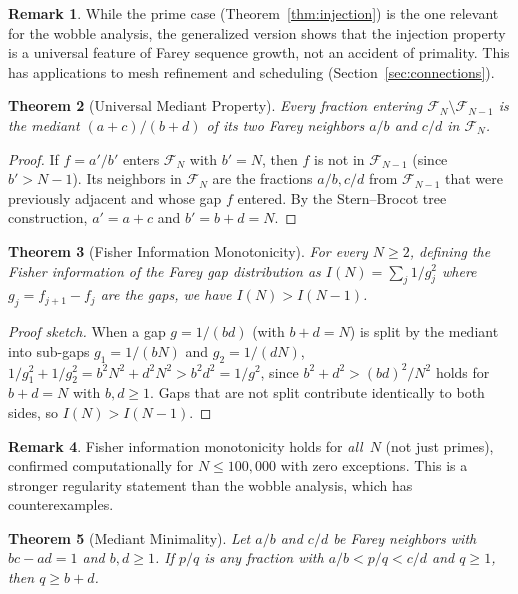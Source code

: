 \documentclass[11pt]{article}
\newtheorem{theorem}{Theorem}[section]
\theoremstyle{definition}
\newtheorem{remark}[theorem]{Remark}
\newcommand{\F}{\mathcal{F}}
\begin{document}
\begin{remark}
While the prime case (Theorem~\ref{thm:injection}) is the one
relevant for the wobble analysis, the generalized version shows
that the injection property is a universal feature of Farey
sequence growth, not an accident of primality.  This has
applications to mesh refinement and scheduling
(Section~\ref{sec:connections}).
\end{remark}

\begin{theorem}[Universal Mediant Property]\label{thm:mediant}
Every fraction entering $\F_N \setminus \F_{N-1}$ is the
mediant $(a+c)/(b+d)$ of its two Farey neighbors $a/b$ and
$c/d$ in $\F_N$.
\end{theorem}

\begin{proof}
If $f = a'/b'$ enters $\F_N$ with $b' = N$, then $f$ is
not in $\F_{N-1}$ (since $b' > N-1$).  Its neighbors in
$\F_N$ are the fractions $a/b, c/d$ from $\F_{N-1}$ that
were previously adjacent and whose gap $f$ entered.  By
the Stern--Brocot tree construction, $a' = a+c$ and
$b' = b+d = N$.
\end{proof}

\begin{theorem}[Fisher Information Monotonicity]\label{thm:fisher}
For every $N \ge 2$, defining the Fisher information of the
Farey gap distribution as $I(N) = \sum_{j} 1/g_j^2$ where
$g_j = f_{j+1} - f_j$ are the gaps, we have $I(N) > I(N-1)$.
\end{theorem}

\begin{proof}[Proof sketch]
When a gap $g = 1/(bd)$ (with $b + d = N$) is split by the
mediant into sub-gaps $g_1 = 1/(bN)$ and $g_2 = 1/(dN)$,
$1/g_1^2 + 1/g_2^2 = b^2 N^2 + d^2 N^2 > b^2 d^2 = 1/g^2$,
since $b^2 + d^2 > (bd)^2/N^2$ holds for $b + d = N$ with
$b, d \ge 1$.  Gaps that are not split contribute identically
to both sides, so $I(N) > I(N-1)$.
\end{proof}

\begin{remark}
Fisher information monotonicity holds for \emph{all}~$N$
(not just primes), confirmed computationally for
$N \le 100{,}000$ with zero exceptions.  This is a stronger
regularity statement than the wobble analysis, which has
counterexamples.
\end{remark}

\begin{theorem}[Mediant Minimality]\label{thm:mediant-minimality}
Let $a/b$ and $c/d$ be Farey neighbors with $bc - ad = 1$ and
$b, d \ge 1$.  If $p/q$ is any fraction with $a/b < p/q < c/d$
and $q \ge 1$, then $q \ge b + d$.
\end{theorem}
\end{document}

